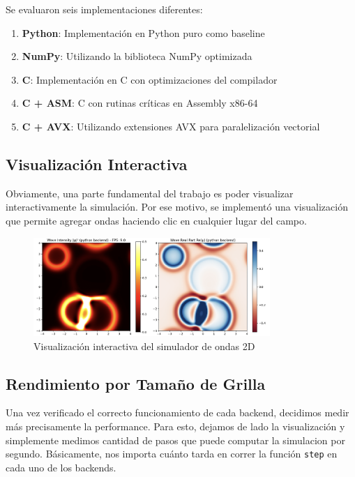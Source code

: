 \documentclass[a4paper]{article}
\begin{document}
Se evaluaron seis implementaciones diferentes:
\begin{enumerate}
    \item \textbf{Python}: Implementación en Python puro como baseline
    \item \textbf{NumPy}: Utilizando la biblioteca NumPy optimizada
    \item \textbf{C}: Implementación en C con optimizaciones del compilador
    \item \textbf{C + ASM}: C con rutinas críticas en Assembly x86-64
    \item \textbf{C + AVX}: Utilizando extensiones AVX para paralelización vectorial
\end{enumerate}

\subsection{Visualización Interactiva}
Obviamente, una parte fundamental del trabajo es poder visualizar interactivamente la simulación. Por ese motivo, se implementó una visualización que permite agregar ondas haciendo clic en cualquier lugar del campo.

\begin{figure}[h]
    \centering
    \includegraphics[width=0.8\textwidth]{extra/live_visualization.png}
    \caption{Visualización interactiva del simulador de ondas 2D}
    \label{fig:live_visualization}
\end{figure}

\subsection{Rendimiento por Tamaño de Grilla}
Una vez verificado el correcto funcionamiento de cada backend, decidimos medir más precisamente la performance. Para esto, dejamos de lado la visualización y simplemente medimos cantidad de pasos que puede computar la simulacion por segundo. Básicamente, nos importa cuánto tarda en correr la función \texttt{step} en cada uno de los backends.
\end{document}
